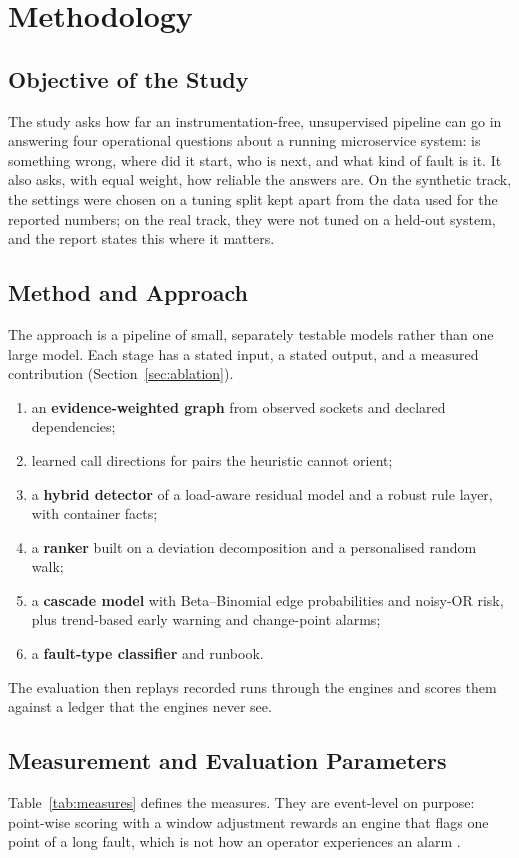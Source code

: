 \clearpage
\chapter[METHODOLOGY]{Methodology}
\label{ch:method}

\section{Objective of the Study}
The study asks how far an instrumentation-free, unsupervised pipeline can go in answering four operational questions about a running microservice system: is something wrong, where did it start, who is next, and what kind of fault is it. It also asks, with equal weight, how reliable the answers are. On the synthetic track, the settings were chosen on a tuning split kept apart from the data used for the reported numbers; on the real track, they were not tuned on a held-out system, and the report states this where it matters.

\section{Method and Approach}
The approach is a pipeline of small, separately testable models rather than one large model. Each stage has a stated input, a stated output, and a measured contribution (Section~\ref{sec:ablation}).
\begin{enumerate}
\item an \textbf{evidence-weighted graph} from observed sockets and declared dependencies;
\item learned call directions for pairs the heuristic cannot orient;
\item a \textbf{hybrid detector} of a load-aware residual model and a robust rule layer, with container facts;
\item a \textbf{ranker} built on a deviation decomposition and a personalised random walk;
\item a \textbf{cascade model} with Beta--Binomial edge probabilities and noisy-OR risk, plus trend-based early warning and change-point alarms;
\item a \textbf{fault-type classifier} and runbook.
\end{enumerate}
The evaluation then replays recorded runs through the engines and scores them against a ledger that the engines never see.

\section{Measurement and Evaluation Parameters}
Table~\ref{tab:measures} defines the measures. They are event-level on purpose: point-wise scoring with a window adjustment rewards an engine that flags one point of a long fault, which is not how an operator experiences an alarm \cite{wu2021flawed,kim2022rigorous,tatbul2018precision}.

